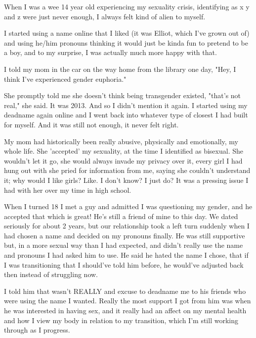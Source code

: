 {When I was a wee 14 year old experiencing my sexuality crisis, identifying as x
y and z were just never enough, I always felt kind of alien to myself.

I started using a name online that I liked (it was Elliot, which I've grown out
of) and using he/him pronouns thinking it would just be kinda fun to pretend to
be a boy, and to my surprise, I was actually much more happy with that.

I told my mom in the car on the way home from the library one day, "Hey, I
think I've experienced gender euphoria."

She promptly told me she doesn't think being transgender existed, "that's not
real," she said. It was 2013. And so I didn't mention it again. I started using
my deadname again online and I went back into whatever type of closest I had
built for myself. And it was still not enough, it never felt right.

My mom had historically been really abusive, physically and emotionally, my
whole life. She 'accepted' my sexuality, at the time I identified as bisexual.
She wouldn't let it go, she would always invade my privacy over it, every girl
I had hung out with she pried for information from me, saying she couldn't
understand it; why would I like girls? Like. I don't know? I just do? It was a
pressing issue I had with her over my time in high school.

When I turned 18 I met a guy and admitted I was questioning my gender, and he
accepted that which is great! He's still a friend of mine to this day. We dated
seriously for about 2 years, but our relationship took a left turn suddenly
when I had chosen a name and decided on my pronouns finally. He was still
supportive but, in a more sexual way than I had expected, and didn't really use
the name and pronouns I had asked him to use. He said he hated the name I
chose, that if I was transitioning that I should've told him before, he
would've adjusted back then instead of struggling now.

I told him that wasn't REALLY and excuse to deadname me to his friends who were
using the name I wanted. Really the most support I got from him was when he was
interested in having sex, and it really had an affect on my mental health and
how I view my body in relation to my transition, which I'm still working
through as I progress.

}
